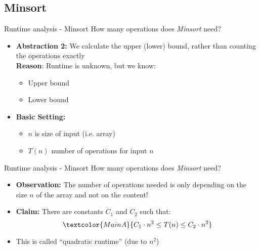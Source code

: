 
\subsection{Minsort}


\begin{frame}{Runtime analysis - Minsort}
  How many operations does \textit{Minsort} need?
  \begin{itemize}
    \item
      \textbf{Abstraction 2:} We calculate the upper (lower) bound,
      rather than counting the operations exactly\\[0.5em]
      \textbf{Reason}: Runtime is unknown, but we know:
      \begin{itemize}
        \item {\color{MainBLight}Upper bound}
        \item {\color{MainBLight}Lower bound}
      \end{itemize}
      \vspace{1em}
    \item
      \textbf{Basic Setting:}
      \begin{itemize}
        \item
          {\color{MainA}$n$} is size of input (i.e. array)
        \item
          {\color{MainA}$T(n)$} number of operations for input
          {\color{MainA}$n$}
      \end{itemize}
  \end{itemize}
\end{frame}


\begin{frame}{Runtime analysis - Minsort}
  How many operations does \textit{Minsort} need?
  \begin{itemize}
    \item
      \textbf{Observation:}
      The number of operations needed is only depending on the size
      {\color{MainA}$n$} of the array and not on the content!
    \item
      \textbf{Claim:} There are constants {\color{MainA}$C_1$}
      and {\color{MainA}$C_2$} such that:
      \begin{displaymath}
        \textcolor{MainA}{C_1 \cdot n^2 \leq T(n) \leq C_2 \cdot n^2}
      \end{displaymath}%
    \item
      This is called \enquote{quadratic runtime} (due to {\color{MainA}$n^2$})
  \end{itemize}
\end{frame}

